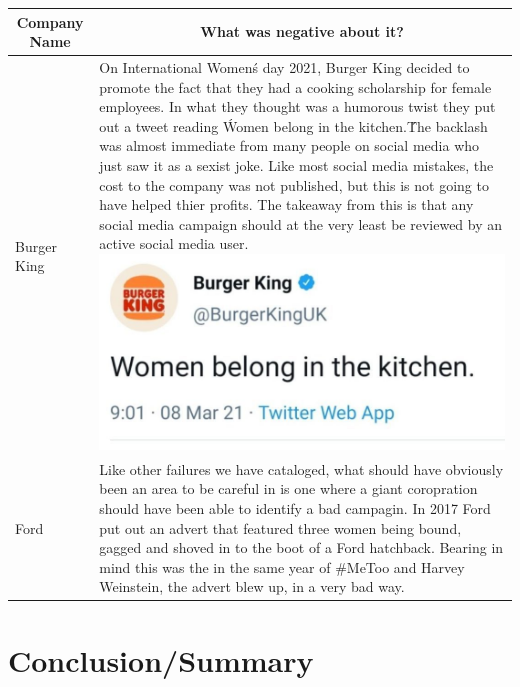 \documentclass{article}
\begin{document}
\begin{table}[htbp]
    \centering
    \begin{tabular}{|p{}|p{}|}
       \hline
       \multicolumn{1}{c}{\bfseries Company Name} & \multicolumn{1}{c}{\bfseries What was negative about it?}  \\
        \hline
	Burger King & On International Women\'s day 2021, Burger King decided to promote the fact that they had a cooking scholarship for female employees. In what they thought was a humorous twist they put out a tweet reading \'Women belong in the kitchen.\' The backlash was almost immediate from many people on social media who just saw it as a sexist joke. Like most social media mistakes, the cost to the company was not published, but this is not going to have helped thier profits. The takeaway from this is that any social media campaign should at the very least be reviewed by an active social media user. \cite{BK} \includegraphics[scale=0.3]{BK} \\
        \hline
	Ford & Like other failures we have cataloged, what should have obviously been an area to be careful in is one where a giant coropration should have been able to identify a bad campagin. In 2017 Ford put out an advert that featured three women being bound, gagged and shoved in to the boot of a Ford hatchback. Bearing in mind this was the in the same year of \#MeToo and Harvey Weinstein, the advert blew up, in a very bad way. \cite{Ford} \\
        \hline
    \end{tabular}
\end{table}
\FloatBarrier

\section{Conclusion/Summary}
\end{document}
